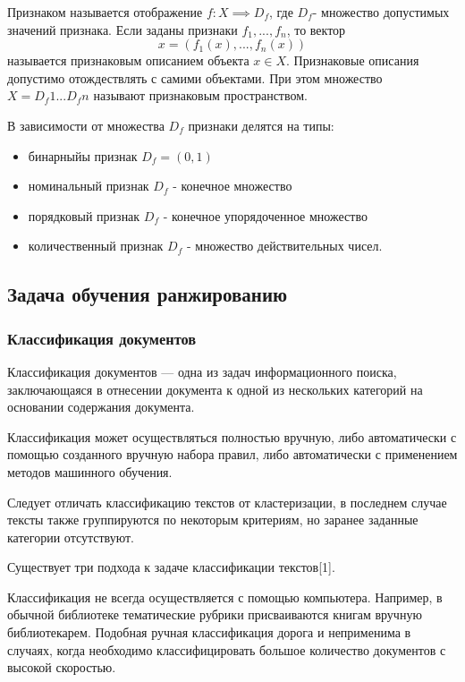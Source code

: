Признаком называется отображение $f: X \implies D_f$, где $D_f$- множество допустимых значений признака. Если заданы признаки $f_1,...,f_n$, то вектор
\begin{equation}
  x=(f_1(x),...,f_n(x))
\end{equation}
называется признаковым описанием объекта $x \in X$. Признаковые описания допустимо отождествлять с самими объектами. При этом множество $X=D_f1 ... D_fn$ называют признаковым пространством. 

В зависимости от множества $D_f$ признаки делятся на типы:
\begin{itemize}
  \item бинарныйы признак $D_f=(0,1)$
  \item номинальный признак $D_f$ - конечное множество
  \item порядковый признак $D_f$ - конечное упорядоченное множество
  \item количественный признак $D_f$ - множество действительных чисел.
\end{itemize}

\subsection{Задача обучения ранжированию}

\subsubsection{Классификация документов}

Классификация документов — одна из задач информационного поиска, заключающаяся в отнесении документа к одной из нескольких категорий на основании содержания документа.

Классификация может осуществляться полностью вручную, либо автоматически с помощью созданного вручную набора правил, либо автоматически с применением методов машинного обучения.

Следует отличать классификацию текстов от кластеризации, в последнем случае тексты также группируются по некоторым критериям, но заранее заданные категории отсутствуют.

Существует три подхода к задаче классификации текстов[1].

Классификация не всегда осуществляется с помощью компьютера. Например, в обычной библиотеке тематические рубрики присваиваются книгам вручную библиотекарем. Подобная ручная классификация дорога и неприменима в случаях, когда необходимо классифицировать большое количество документов с высокой скоростью.


